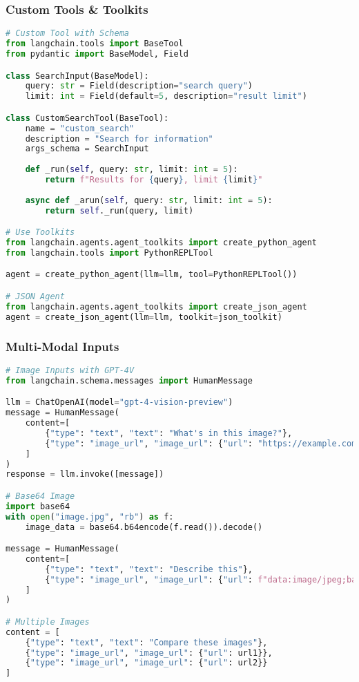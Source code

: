 \begin{frame}[fragile]\frametitle{Custom Tools \& Toolkits}
\begin{lstlisting}[language=python,basicstyle=\tiny]
# Custom Tool with Schema
from langchain.tools import BaseTool
from pydantic import BaseModel, Field

class SearchInput(BaseModel):
    query: str = Field(description="search query")
    limit: int = Field(default=5, description="result limit")

class CustomSearchTool(BaseTool):
    name = "custom_search"
    description = "Search for information"
    args_schema = SearchInput
    
    def _run(self, query: str, limit: int = 5):
        return f"Results for {query}, limit {limit}"
    
    async def _arun(self, query: str, limit: int = 5):
        return self._run(query, limit)

# Use Toolkits
from langchain.agents.agent_toolkits import create_python_agent
from langchain.tools import PythonREPLTool

agent = create_python_agent(llm=llm, tool=PythonREPLTool())

# JSON Agent
from langchain.agents.agent_toolkits import create_json_agent
agent = create_json_agent(llm=llm, toolkit=json_toolkit)
\end{lstlisting}
\end{frame}

\begin{frame}[fragile]\frametitle{Multi-Modal Inputs}
\begin{lstlisting}[language=python,basicstyle=\tiny]
# Image Inputs with GPT-4V
from langchain.schema.messages import HumanMessage

llm = ChatOpenAI(model="gpt-4-vision-preview")
message = HumanMessage(
    content=[
        {"type": "text", "text": "What's in this image?"},
        {"type": "image_url", "image_url": {"url": "https://example.com/img.jpg"}}
    ]
)
response = llm.invoke([message])

# Base64 Image
import base64
with open("image.jpg", "rb") as f:
    image_data = base64.b64encode(f.read()).decode()

message = HumanMessage(
    content=[
        {"type": "text", "text": "Describe this"},
        {"type": "image_url", "image_url": {"url": f"data:image/jpeg;base64,{image_data}"}}
    ]
)

# Multiple Images
content = [
    {"type": "text", "text": "Compare these images"},
    {"type": "image_url", "image_url": {"url": url1}},
    {"type": "image_url", "image_url": {"url": url2}}
]
\end{lstlisting}
\end{frame}

